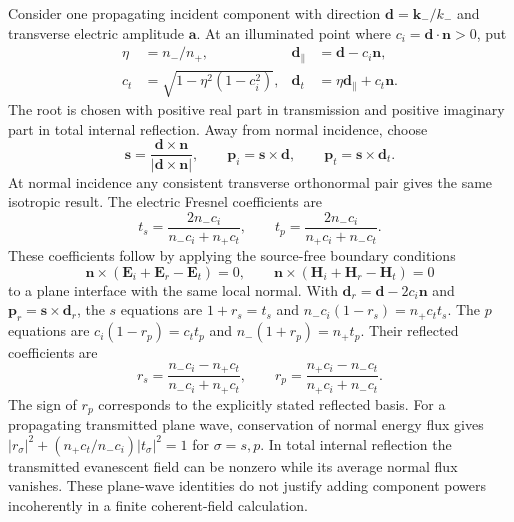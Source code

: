 \documentclass[11pt,a4paper]{article}
\newcommand{\vct}[1]{\bm{#1}}
\numberwithin{equation}{section}
\begin{document}
Consider one propagating incident component with direction
$\vct d=\vct k_-/k_-$ and transverse electric amplitude $\vct a$.
At an illuminated point where $c_i=\vct d\cdot\vct n>0$, put
\begin{align}
 \eta&=n_-/n_+,&
 \vct d_\parallel&=\vct d-c_i\vct n,\\
 c_t&=\sqrt{1-\eta^2(1-c_i^2)},&
 \vct d_t&=\eta\vct d_\parallel+c_t\vct n.
 \label{eq:snell}
\end{align}
The root is chosen with positive real part in transmission and positive
imaginary part in total internal reflection. Away from normal incidence,
choose
\begin{equation}
 \vct s=\frac{\vct d\times\vct n}{|\vct d\times\vct n|},\qquad
 \vct p_i=\vct s\times\vct d,\qquad
 \vct p_t=\vct s\times\vct d_t.
\end{equation}
At normal incidence any consistent transverse orthonormal pair gives the same
isotropic result. The electric Fresnel coefficients are
\begin{equation}
 t_s=\frac{2n_-c_i}{n_-c_i+n_+c_t},\qquad
 t_p=\frac{2n_-c_i}{n_+c_i+n_-c_t}.
 \label{eq:fresnel}
\end{equation}
These coefficients follow by applying the source-free boundary conditions
\begin{equation}
 \vct n\times(\vct E_i+\vct E_r-\vct E_t)=0,\qquad
 \vct n\times(\vct H_i+\vct H_r-\vct H_t)=0
\end{equation}
to a plane interface with the same local normal. With
$\vct d_r=\vct d-2c_i\vct n$ and $\vct p_r=\vct s\times\vct d_r$,
the $s$ equations are $1+r_s=t_s$ and
$n_-c_i(1-r_s)=n_+c_t t_s$. The $p$ equations are
$c_i(1-r_p)=c_t t_p$ and $n_-(1+r_p)=n_+t_p$.
Their reflected coefficients are
\begin{equation}
 r_s=\frac{n_-c_i-n_+c_t}{n_-c_i+n_+c_t},\qquad
 r_p=\frac{n_+c_i-n_-c_t}{n_+c_i+n_-c_t}.
\end{equation}
The sign of $r_p$ corresponds to the explicitly stated reflected basis.
For a propagating transmitted plane wave, conservation of normal energy flux
gives $|r_\sigma|^2+(n_+c_t/n_-c_i)|t_\sigma|^2=1$ for
$\sigma=s,p$. In total internal reflection the transmitted evanescent field
can be nonzero while its average normal flux vanishes. These plane-wave
identities do not justify adding component powers incoherently in a finite
coherent-field calculation.
\end{document}
